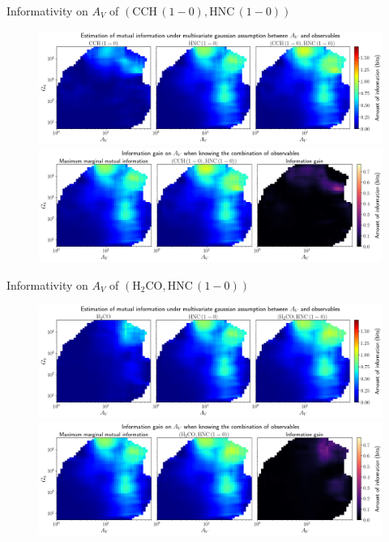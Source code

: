 \documentclass{beamer}
\begin{document}
\begin{frame}{Informativity on $A_V$ of $\left(\mathrm{CCH\,(1-0)},\mathrm{HNC\,(1-0)}\right)$}
    \begin{figure}
        \centering
        \includegraphics[width=0.95\linewidth]{../linearinfo/av__cch10_hnc10_linearinfo.png}
        \vfill
        \includegraphics[width=0.95\linewidth]{../linearinfo/av__cch10_hnc10_linearinfo_gain.png}
    \end{figure}
\end{frame}

\begin{frame}{Informativity on $A_V$ of $\left(\mathrm{H_2CO},\mathrm{HNC\,(1-0)}\right)$}
    \begin{figure}
        \centering
        \includegraphics[width=0.95\linewidth]{../linearinfo/av__h2co_hnc10_linearinfo.png}
        \vfill
        \includegraphics[width=0.95\linewidth]{../linearinfo/av__h2co_hnc10_linearinfo_gain.png}
    \end{figure}
\end{frame}
\end{document}
